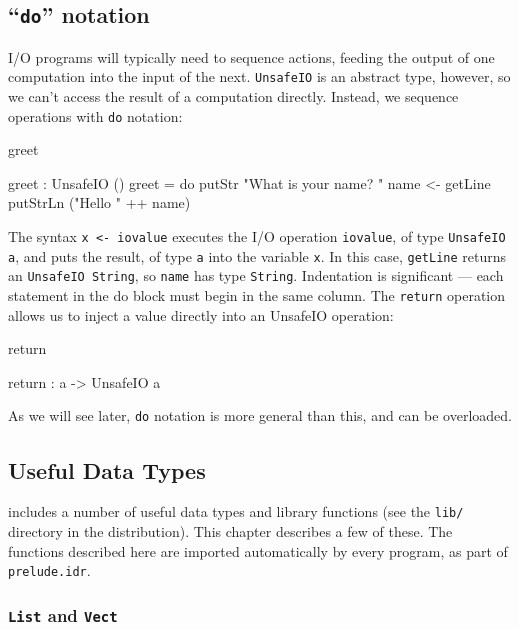\subsection{``\texttt{do}'' notation}

\label{sect:do}

I/O programs will typically need to sequence actions, feeding the output of one
computation into the input of the next. \texttt{UnsafeIO} is an abstract type, however, so we
can't access the result of a computation directly. Instead, we sequence
operations with \texttt{do} notation:

\begin{SaveVerbatim}{greet}

greet : UnsafeIO ()
greet = do putStr "What is your name? "
           name <- getLine
           putStrLn ("Hello " ++ name)

\end{SaveVerbatim}

\noindent
The syntax \texttt{x <- iovalue} executes the I/O operation \texttt{iovalue}, of type 
\texttt{UnsafeIO a}, and
puts the result, of type \texttt{a} into the variable \texttt{x}. 
In this case, \texttt{getLine} returns an \texttt{UnsafeIO String},
so \texttt{name} has type \texttt{String}. Indentation is significant --- each
statement in the do block must begin in the same column.
The \texttt{return} operation allows us to inject a value directly into an UnsafeIO
operation:

\begin{SaveVerbatim}{return}

return : a -> UnsafeIO a

\end{SaveVerbatim}

\noindent
As we will see later, \texttt{do} notation is more general than this, and can be
overloaded.

\subsection{Useful Data Types}

\Idris{} includes a number of useful data types and library functions (see the
\texttt{lib/} directory in the distribution). This chapter describes a few of these. The
functions described here are imported automatically by every \Idris{} program, as
part of \texttt{prelude.idr}.

\subsubsection{\texttt{List} and \texttt{Vect}}

